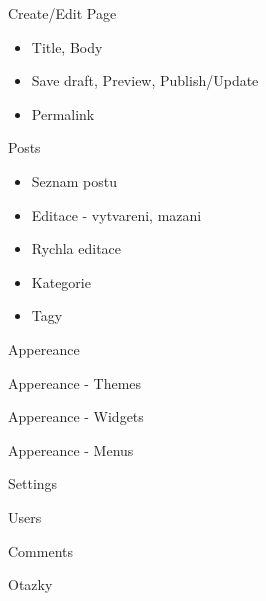 \documentclass{beamer}
\begin{document}
\begin{frame}
    {Create/Edit Page}

    \begin{itemize}
        \item Title, Body
        \item Save draft, Preview, Publish/Update
        \item Permalink
    \end{itemize}
\end{frame}


\begin{frame}
    {Posts}

    \begin{itemize}
        \item Seznam postu
        \item Editace - vytvareni, mazani
        \item Rychla editace
        \item Kategorie
        \item Tagy
    \end{itemize}
\end{frame}


\begin{frame}
    {Appereance}
\end{frame}


\begin{frame}
    {Appereance - Themes}
\end{frame}


\begin{frame}
    {Appereance - Widgets}
\end{frame}


\begin{frame}
    {Appereance - Menus}
\end{frame}


\begin{frame}
    {Settings}
\end{frame}


\begin{frame}
    {Users}
\end{frame}


\begin{frame}
    {Comments}
\end{frame}


\begin{frame}
    {Otazky}
\end{frame}
\end{document}
